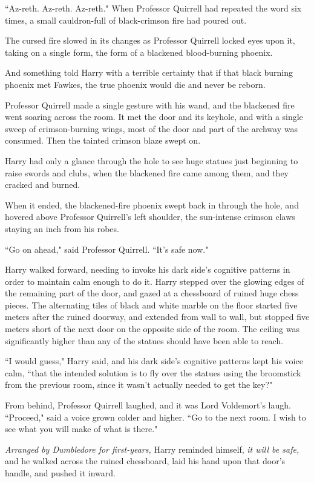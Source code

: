 ``Az-reth. Az-reth. Az-reth." When Professor Quirrell had repeated the word six times, a small cauldron-full of black-crimson fire had poured out.

The cursed fire slowed in its changes as Professor Quirrell locked eyes upon it, taking on a single form, the form of a blackened blood-burning phoenix.

And something told Harry with a terrible certainty that if that black burning phoenix met Fawkes, the true phoenix would die and never be reborn.

Professor Quirrell made a single gesture with his wand, and the blackened fire went soaring across the room. It met the door and its keyhole, and with a single sweep of crimson-burning wings, most of the door and part of the archway was consumed. Then the tainted crimson blaze swept on.

Harry had only a glance through the hole to see huge statues just beginning to raise swords and clubs, when the blackened fire came among them, and they cracked and burned.

When it ended, the blackened-fire phoenix swept back in through the hole, and hovered above Professor Quirrell's left shoulder, the sun-intense crimson claws staying an inch from his robes.

``Go on ahead," said Professor Quirrell. ``It's safe now."

Harry walked forward, needing to invoke his dark side's cognitive patterns in order to maintain calm enough to do it. Harry stepped over the glowing edges of the remaining part of the door, and gazed at a chessboard of ruined huge chess pieces. The alternating tiles of black and white marble on the floor started five meters after the ruined doorway, and extended from wall to wall, but stopped five meters short of the next door on the opposite side of the room. The ceiling was significantly higher than any of the statues should have been able to reach.

``I would guess," Harry said, and his dark side's cognitive patterns kept his voice calm, ``that the intended solution is to fly over the statues using the broomstick from the previous room, since it wasn't actually needed to get the key?"

From behind, Professor Quirrell laughed, and it was Lord Voldemort's laugh. ``Proceed," said a voice grown colder and higher. ``Go to the next room. I wish to see what you will make of what is there."

\emph{Arranged by Dumbledore for first-years,} Harry reminded himself, \emph{it \emph{will} be safe,} and he walked across the ruined chessboard, laid his hand upon that door's handle, and pushed it inward.

